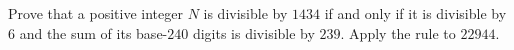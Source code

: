 Prove that a positive integer $N$ is divisible by $1434$ if and only if it is divisible by $6$ and the sum of its base-$240$ digits is divisible by $239$. Apply the rule to $22944$.
